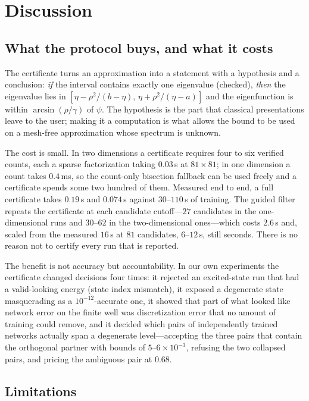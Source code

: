 \section{Discussion}
\label{sec:discussion}

\subsection{What the protocol buys, and what it costs}

The certificate turns an approximation into a statement with a hypothesis and
a conclusion: \emph{if} the interval contains exactly one eigenvalue (checked),
\emph{then} the eigenvalue lies in $[\eta-\rho^2/(b-\eta),\,\eta+\rho^2/(\eta-a)]$
and the eigenfunction is within $\arcsin(\rho/\gamma)$ of $\psi$. The
hypothesis is the part that classical presentations leave to the user; making
it a computation is what allows the bound to be used on a mesh-free
approximation whose spectrum is unknown.

The cost is small. In two dimensions a certificate requires four to six
verified counts, each a sparse factorization taking $0.03$\,s at
$81\times81$; in one dimension a count takes $0.4$\,ms, so the count-only
bisection fallback can be used freely and a certificate spends some two
hundred of them. Measured end to end, a full certificate takes $0.19$\,s and
$0.074$\,s against $30$--$110$\,s of training. The guided filter repeats the certificate at each
candidate cutoff---$27$ candidates in the one-dimensional runs and $30$--$62$
in the two-dimensional ones---which costs $2.6$\,s and, scaled from the
measured $16$\,s at $81$ candidates, $6$--$12$\,s, still seconds. There is no reason not to certify every run that is reported.

The benefit is not accuracy but accountability. In our own experiments the
certificate changed decisions four times: it rejected an excited-state run
that had a valid-looking energy (state index mismatch), it exposed a
degenerate state masquerading as a $10^{-12}$-accurate one, it showed that
part of what looked like network error on the finite well was discretization
error that no amount of training could remove, and it decided which pairs of
independently trained networks actually span a degenerate level---accepting
the three pairs that contain the orthogonal partner with bounds of
$5$--$6\times10^{-3}$, refusing the two collapsed pairs, and pricing the
ambiguous pair at $0.68$.

\subsection{Limitations}

